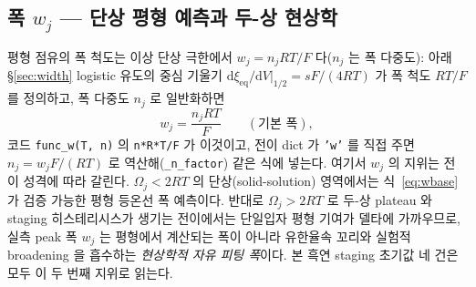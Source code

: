 \documentclass[11pt,a4paper]{article}
\newcommand{\dd}{\mathrm{d}}
\newcommand{\eq}{\mathrm{eq}}
\newcommand{\code}[1]{\texttt{#1}}
\begin{document}
\subsection{폭 $w_j$ — 단상 평형 예측과 두-상 현상학}
평형 점유의 폭 척도는 이상 단상 극한에서 $w_j=n_jRT/F$ 다($n_j$ 는 폭 다중도): 아래 \S\ref{sec:width} logistic 유도의
중심 기울기 $\dd\xi_\eq/\dd V|_{1/2}=sF/(4RT)$ 가 폭 척도 $RT/F$ 를 정의하고, 폭 다중도 $n_j$ 로 일반화하면
\begin{equation}
w_j=\frac{n_jRT}{F}\qquad(\text{기본 폭}),
\label{eq:wbase}
\end{equation}
코드 \code{func\_w(T, n)} 의 \code{n*R*T/F}
가 이것이고, 전이 dict 가 \code{'w'} 를 직접 주면 $n_j=w_jF/(RT)$ 로 역산해(\code{\_n\_factor}) 같은 식에 넣는다.
여기서 $w_j$ 의 지위는 전이 성격에 따라 갈린다. $\Omega_j<2RT$ 의 단상(solid-solution) 영역에서는 식~\eqref{eq:wbase} 가
검증 가능한 평형 등온선 폭 예측이다. 반대로 $\Omega_j>2RT$ 로 두-상 plateau 와 staging 히스테리시스가 생기는 전이에서는
단일입자 평형 기여가 델타에 가까우므로, 실측 peak 폭 $w_j$ 는 평형에서 계산되는 폭이 아니라 유한율속 꼬리와 실험적
broadening 을 흡수하는 \emph{현상학적 자유 피팅 폭}이다. 본 흑연 staging 초기값 네 건은 모두 이 두 번째 지위로 읽는다.
\end{document}
